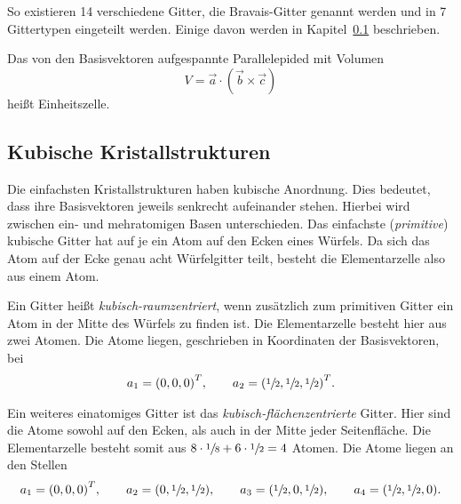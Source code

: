 So existieren 14 verschiedene Gitter, die Bravais-Gitter genannt werden
und in 7 Gittertypen eingeteilt werden.
Einige davon werden in Kapitel~\ref{sub:kubische_kristallstrukturen} beschrieben.

Das von den Basisvektoren aufgespannte Parallelepided mit Volumen
\begin{equation}
  V = \vec{a} \cdot \left(\vec{b} \times \vec{c}\right)
\end{equation}
heißt Einheitszelle.


\subsection{Kubische Kristallstrukturen}%
\label{sub:kubische_kristallstrukturen}
Die einfachsten Kristallstrukturen haben kubische Anordnung.
Dies bedeutet, dass ihre Basisvektoren jeweils senkrecht aufeinander stehen.
Hierbei wird zwischen ein- und mehratomigen Basen unterschieden.
Das einfachste (\textit{primitive}) kubische Gitter hat auf je ein Atom auf den Ecken eines Würfels.
Da sich das Atom auf der Ecke genau acht Würfelgitter teilt,
besteht die Elementarzelle also aus einem Atom.

Ein Gitter heißt \textit{kubisch-raumzentriert}, wenn zusätzlich zum primitiven Gitter
ein Atom in der Mitte des Würfels zu finden ist.
Die Elementarzelle besteht hier aus zwei Atomen.
Die Atome liegen, geschrieben in Koordinaten der Basisvektoren, bei
\begin{align*}
  a_1 = {\left(0, 0, 0\right)}^T, \hspace{2em} a_2 = {\left(\sfrac{1}{2}, \sfrac{1}{2}, \sfrac{1}{2}\right)}^T.
\end{align*}

Ein weiteres einatomiges Gitter ist das \textit{kubisch-flächenzentrierte} Gitter.
Hier sind die Atome sowohl auf den Ecken, als auch in der Mitte jeder Seitenfläche.
Die Elementarzelle besteht somit aus $8 \cdot \sfrac{1}{8} + 6 \cdot \sfrac{1}{2} = 4$ Atomen.
Die Atome liegen an den Stellen
\begin{align*}
  a_1 = {\left(0, 0, 0\right)}^T, \hspace{2em}
  a_2 = {\left(0, \sfrac{1}{2}, \sfrac{1}{2}\right)}, \hspace{2em}
  a_3 = {\left(\sfrac{1}{2}, 0, \sfrac{1}{2}\right)}, \hspace{2em}
  a_4 = {\left(\sfrac{1}{2}, \sfrac{1}{2}, 0\right)}.
\end{align*}

